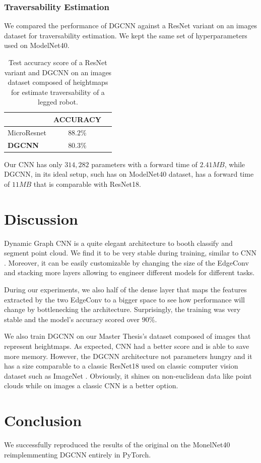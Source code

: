 \documentclass[twocolumn,showpacs,
  nofootinbib,aps,superscriptaddress,
  eqsecnum,prd,notitlepage,showkeys,10pt]{revtex4-1}
\begin{document}
\subsubsection{Traversability Estimation}
We compared the performance of DGCNN against a ResNet \cite{he2015deep} variant on an images dataset for traversability estimation. We kept the same set of hyperparameters used on ModelNet40.
\begin{table}[H]
  \centering
  \begin{tabular}{lcc}
    & ACCURACY \\
    \hline
    MicroResnet & $88.2$\%  \\
    \textbf{DGCNN} & $80.3$\%  \\
    \hline
  \end{tabular}
  \caption{Test accuracy score of a ResNet variant and DGCNN on an images dataset composed of heightmaps for estimate traversability of a legged robot.}
\end{table}
Our CNN has only $314,282$ parameters with a  forward time of $2.41MB$, while DGCNN, in its ideal setup, such has on ModelNet40 dataset, has a forward time of $11MB$ that is comparable with ResNet18. 
\section{Discussion}
Dynamic Graph CNN is a quite elegant architecture to booth classify and segment point cloud. We find it to be very stable during training, similar to CNN . Moreover, it can be easily customizable by changing the size of the EdgeConv and stacking more layers allowing to engineer different models for different tasks.

During our experiments, we also half of the dense layer that maps the features extracted by the two EdgeConv to a bigger space to see how performance will change by bottlenecking the architecture. Surprisingly, the training was very stable and the model's accuracy scored over $90\%$. 

We also train DGCNN on our Master Thesis's dataset composed of images that represent heightmaps. As expected, CNN had a better score and is able to save more memory. However, the DGCNN architecture not parameters hungry and it has a size comparable to a classic ResNet18 used on classic computer vision dataset such as ImageNet \cite{imagenet}. Obviously, it shines on non-euclidean data like point clouds while on images a classic CNN is a better option.

\section{Conclusion}
We successfully reproduced the results of the original on the MonelNet40 reimplemmenting DGCNN entirely in PyTorch. 
\newpage

\end{document}
